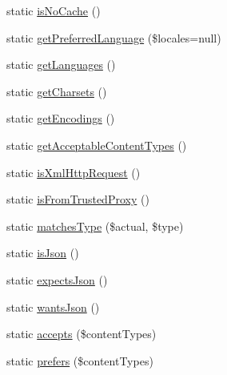 \begin{DoxyCompactItemize}
\item 
static \mbox{\hyperlink{class_illuminate_1_1_support_1_1_facades_1_1_request_a336ff9cf1ed0222ac38432f1f0ac952f}{is\+No\+Cache}} ()
\item 
static \mbox{\hyperlink{class_illuminate_1_1_support_1_1_facades_1_1_request_aa8cf52deb0fe5bdb8f0639d5d000c53d}{get\+Preferred\+Language}} (\$locales=null)
\item 
static \mbox{\hyperlink{class_illuminate_1_1_support_1_1_facades_1_1_request_a100339c165aa3a2ff6374907b8059aad}{get\+Languages}} ()
\item 
static \mbox{\hyperlink{class_illuminate_1_1_support_1_1_facades_1_1_request_a5a4578c833d85fc7e52e25c9f274f424}{get\+Charsets}} ()
\item 
static \mbox{\hyperlink{class_illuminate_1_1_support_1_1_facades_1_1_request_ae76151ec6bc38639073829d214961649}{get\+Encodings}} ()
\item 
static \mbox{\hyperlink{class_illuminate_1_1_support_1_1_facades_1_1_request_a5377820ba036ebea9d4cb9414b4539b3}{get\+Acceptable\+Content\+Types}} ()
\item 
static \mbox{\hyperlink{class_illuminate_1_1_support_1_1_facades_1_1_request_aacae65b6bad777a385ac6ef34651e18a}{is\+Xml\+Http\+Request}} ()
\item 
static \mbox{\hyperlink{class_illuminate_1_1_support_1_1_facades_1_1_request_ab90670394e8992fee5da0dc77227f473}{is\+From\+Trusted\+Proxy}} ()
\item 
static \mbox{\hyperlink{class_illuminate_1_1_support_1_1_facades_1_1_request_aee5d01eac11e7d1748507d446a09a762}{matches\+Type}} (\$actual, \$type)
\item 
static \mbox{\hyperlink{class_illuminate_1_1_support_1_1_facades_1_1_request_aeb9496ac11c40327963f0fa71425b37e}{is\+Json}} ()
\item 
static \mbox{\hyperlink{class_illuminate_1_1_support_1_1_facades_1_1_request_a4524cc3911f859ab2da48657b2c87613}{expects\+Json}} ()
\item 
static \mbox{\hyperlink{class_illuminate_1_1_support_1_1_facades_1_1_request_a427ab22e9702aeee550d669594ea7c03}{wants\+Json}} ()
\item 
static \mbox{\hyperlink{class_illuminate_1_1_support_1_1_facades_1_1_request_a356cb2b43b1c9350e34d5e8ab95230a3}{accepts}} (\$content\+Types)
\item 
static \mbox{\hyperlink{class_illuminate_1_1_support_1_1_facades_1_1_request_a0e130db25d5def4c90ad0ab3fe9f71bd}{prefers}} (\$content\+Types)
\item 

\end{DoxyCompactItemize}
